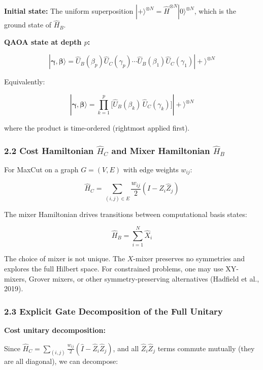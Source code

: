 \documentclass[
  11pt,
]{report}
\begin{document}
\textbf{Initial state:} The uniform superposition
\(|+\rangle^{\otimes N} = \hat{H}^{\otimes N}|0\rangle^{\otimes N}\),
which is the ground state of \(\hat{H}_B\).

\textbf{QAOA state at depth \(p\):}

\[|\boldsymbol{\gamma}, \boldsymbol{\beta}\rangle = \hat{U}_B(\beta_p)\hat{U}_C(\gamma_p) \cdots \hat{U}_B(\beta_1)\hat{U}_C(\gamma_1)|+\rangle^{\otimes N}\]

Equivalently:

\[|\boldsymbol{\gamma}, \boldsymbol{\beta}\rangle = \prod_{k=1}^{p} \bigl[\hat{U}_B(\beta_k)\,\hat{U}_C(\gamma_k)\bigr] |+\rangle^{\otimes N}\]

where the product is time-ordered (rightmost applied first).

\subsubsection{\texorpdfstring{2.2 Cost Hamiltonian \(\hat{H}_C\) and
Mixer Hamiltonian
\(\hat{H}_B\)}{2.2 Cost Hamiltonian \textbackslash hat\{H\}\_C and Mixer Hamiltonian \textbackslash hat\{H\}\_B}}\label{cost-hamiltonian-hath_c-and-mixer-hamiltonian-hath_b}

For MaxCut on a graph \(G = (V, E)\) with edge weights \(w_{ij}\):

\[\hat{H}_C = \sum_{(i,j) \in E} \frac{w_{ij}}{2}(\hat{I} - \hat{Z}_i \hat{Z}_j)\]

The mixer Hamiltonian drives transitions between computational basis
states:

\[\hat{H}_B = \sum_{i=1}^{N} \hat{X}_i\]

The choice of mixer is not unique. The \(X\)-mixer preserves no
symmetries and explores the full Hilbert space. For constrained
problems, one may use XY-mixers, Grover mixers, or other
symmetry-preserving alternatives (Hadfield et al., 2019).

\subsubsection{2.3 Explicit Gate Decomposition of the Full
Unitary}\label{explicit-gate-decomposition-of-the-full-unitary}

\textbf{Cost unitary decomposition:}

Since
\(\hat{H}_C = \sum_{(i,j)} \frac{w_{ij}}{2}(\hat{I} - \hat{Z}_i\hat{Z}_j)\),
and all \(\hat{Z}_i\hat{Z}_j\) terms commute mutually (they are all
diagonal), we can decompose:
\end{document}
